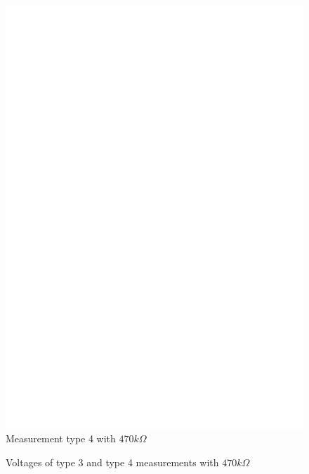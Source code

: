 \begin{figure}[H]
 \centering
 \includegraphics[]{../FIG/ResistormessH2.eps}
 \caption{Measurement type 4 with \(470k\Omega\) }
\label{fig:RH2mes}
\end{figure}

\begin{figure}[H]
\centering

\caption{Voltages of type 3 and type 4 measurements with \(470k\Omega\) }
\label{fig:RHv}
\end{figure}


